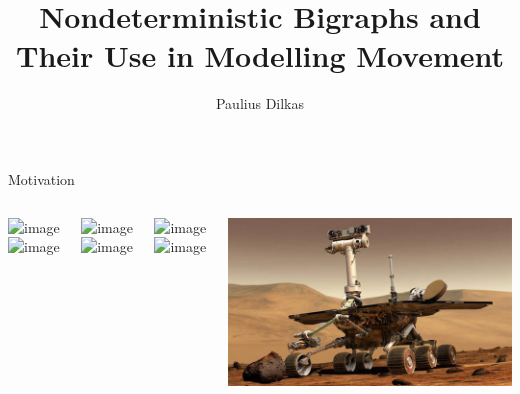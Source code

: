 \documentclass{beamer}
\author{Paulius Dilkas}
\title[Nondeterministic Bigraphs]{Nondeterministic Bigraphs and Their Use in
  Modelling Movement}
\institute[]{School of Computing Science}
\begin{document}
\maketitle

\begin{frame}{Motivation}
  \begin{columns}[t]
    \centering
    \begin{overlayarea}{\textwidth}{0.5\textheight}
      \includegraphics<-2>[width=\textwidth]{uav.jpg}
      \includegraphics<3->[width=\textwidth]{drone.jpg}
    \end{overlayarea}
    \begin{overlayarea}{\textwidth}{0.5\textheight}
      \includegraphics<-3>[width=\textwidth]{underwater.jpg}
      \includegraphics<4->[width=\textwidth]{boat.png}
    \end{overlayarea}
    \centering
    \begin{overlayarea}{\textwidth}{0.5\textheight}
      \includegraphics<1>[width=\textwidth]{ground.jpg}
      \includegraphics<2->[width=\textwidth]{car.jpg}
    \end{overlayarea}
    \includegraphics[width=\textwidth]{rover.jpg}
  \end{columns}
\end{frame}
\end{document}
